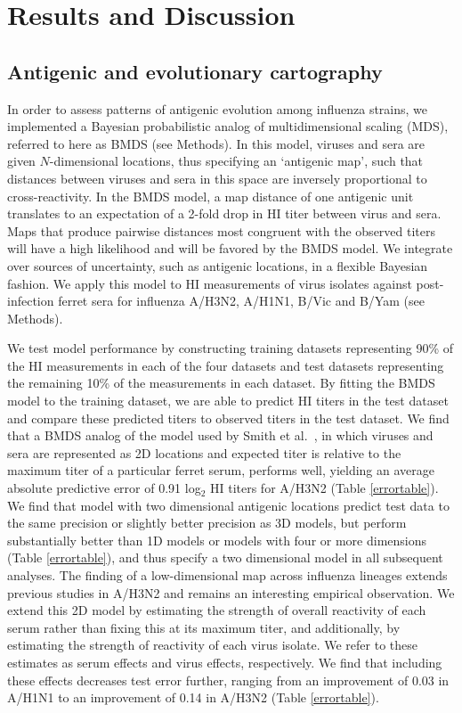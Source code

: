 \documentclass[11pt,oneside,letterpaper]{article}
\begin{document}
\section*{Results and Discussion}

\subsection*{Antigenic and evolutionary cartography}

In order to assess patterns of antigenic evolution among influenza strains, we implemented a Bayesian probabilistic analog of multidimensional scaling (MDS), referred to here as BMDS (see Methods).
In this model, viruses and sera are given $N$-dimensional locations, thus specifying an `antigenic map', such that distances between viruses and sera in this space are inversely proportional to cross-reactivity.
In the BMDS model, a map distance of one antigenic unit translates to an expectation of a 2-fold drop in HI titer between virus and sera.
Maps that produce pairwise distances most congruent with the observed titers will have a high likelihood and will be favored by the BMDS model.
We integrate over sources of uncertainty, such as antigenic locations, in a flexible Bayesian fashion.
We apply this model to HI measurements of virus isolates against post-infection ferret sera for influenza A/H3N2, A/H1N1, B/Vic and B/Yam (see Methods).

We test model performance by constructing training datasets representing 90\% of the HI measurements in each of the four datasets and test datasets representing the remaining 10\% of the measurements in each dataset. 
By fitting the BMDS model to the training dataset, we are able to predict HI titers in the test dataset and compare these predicted titers to observed titers in the test dataset. 
We find that a BMDS analog of the model used by Smith et al.\ \cite{Smith04}, in which viruses and sera are represented as 2D locations and expected titer is relative to the maximum titer of a particular ferret serum, performs well, yielding an average absolute predictive error of 0.91 log$_2$ HI titers for A/H3N2 (Table \ref{errortable}).
We find that model with two dimensional antigenic locations predict test data to the same precision or slightly better precision as 3D models, but perform substantially better than 1D models or models with four or more dimensions (Table \ref{errortable}), and thus specify a two dimensional model in all subsequent analyses.
The finding of a low-dimensional map across influenza lineages extends previous studies in A/H3N2 \cite{Smith04} and remains an interesting empirical observation.
We extend this 2D model by estimating the strength of overall reactivity of each serum rather than fixing this at its maximum titer, and additionally, by estimating the strength of reactivity of each virus isolate.
We refer to these estimates as serum effects and virus effects, respectively.
We find that including these effects decreases test error further, ranging from an improvement of 0.03 in A/H1N1 to an improvement of 0.14 in A/H3N2 (Table \ref{errortable}).
\end{document}
